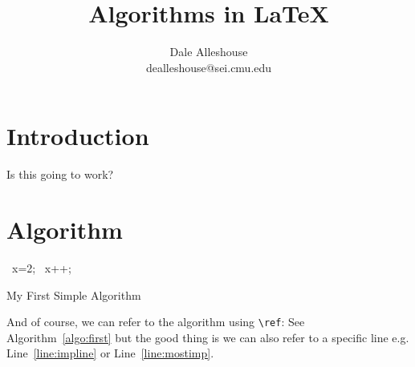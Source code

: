 \documentclass{article}
\begin{document}
\title{Algorithms in \LaTeX}
\author{Dale Alleshouse \\ dealleshouse@sei.cmu.edu}
\maketitle

\section{Introduction}
Is this going to work?

\section{Algorithm}
\begin{algorithm}
  \begin{algorithmic}

    \STATE~x=2;
    \STATE~x++;\label{line:impline}
    \ELSE\
    \RETURN\label{line:mostimp}
    \ENDIF\
  \end{algorithmic}
  \caption{My First Simple Algorithm}\label{algo:first}
\end{algorithm}

And of course, we can refer to the algorithm using \verb|\ref|: See Algorithm~\ref{algo:first} but
the good thing is we can also refer to a specific line e.g. Line~\ref{line:impline} or
Line~\ref{line:mostimp}.
\end{document}
